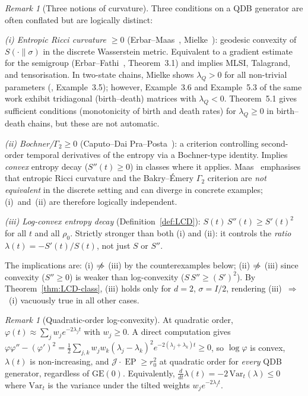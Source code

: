 \documentclass[11pt,a4paper]{article}
\theoremstyle{definition}
\theoremstyle{remark}
\newtheorem{remark}[theorem]{Remark}
\DeclareMathOperator{\EP}{EP}
\newcommand{\GE}{\mathrm{GE}}
\begin{document}
\begin{remark}[Three notions of curvature]\label{rem:GE-vs-LCD}
Three conditions on a QDB generator are often conflated but are
logically distinct:

\emph{(i) Entropic Ricci curvature $\ge 0$}
(Erbar--Maas~\cite{ErbarMaas2012}, Mielke~\cite{Mielke2013}):
geodesic convexity of $S(\cdot\|\sigma)$ in the discrete
Wasserstein metric.  Equivalent to a gradient estimate for the
semigroup (Erbar--Fathi~\cite{ErbarFathi2018},
Theorem~3.1) and implies MLSI,
Talagrand, and tensorisation.
In two-state chains, Mielke shows $\lambda_Q > 0$ for all
non-trivial parameters (\cite{Mielke2013}, Example~3.5);
however, Example~3.6 and Example~5.3 of the same work exhibit
tridiagonal (birth--death) matrices with $\lambda_Q < 0$.
Theorem~5.1 gives sufficient conditions (monotonicity of birth
and death rates) for $\lambda_Q \ge 0$ in birth--death chains,
but these are not automatic.

\emph{(ii) Bochner/$\Gamma_2 \ge 0$}
(Caputo--Dai Pra--Posta~\cite{CaputoDaiPraPosta2009}): a criterion
controlling second-order temporal derivatives of the entropy via a
Bochner-type identity.  Implies \emph{convex} entropy decay
($S''(t) \ge 0$) in classes where it applies.
Maas~\cite{Maas2017} emphasises that entropic Ricci curvature
and the Bakry--\'Emery $\Gamma_2$ criterion are \emph{not
equivalent} in the discrete setting and can diverge in concrete
examples; (i)~and~(ii) are therefore logically independent.

\emph{(iii) Log-convex entropy decay} (Definition~\ref{def:LCD}):
$S(t)\,S''(t) \ge S'(t)^2$ for all $t$ and all $\rho_0$.
Strictly stronger than both (i) and (ii): it controls the
\emph{ratio} $\lambda(t) = -S'(t)/S(t)$, not just $S$ or $S''$.

The implications are:
(i) $\centernot\Rightarrow$ (iii) by the counterexamples below;
(ii) $\centernot\Rightarrow$ (iii) since convexity
($S'' \ge 0$) is weaker than log-convexity
($S\,S'' \ge (S')^2$).
By Theorem~\ref{thm:LCD-class}, (iii) holds only for
$d = 2$, $\sigma = I/2$, rendering (iii)~$\Rightarrow$~(i)
vacuously true in all other cases.
\end{remark}

\begin{remark}[Quadratic-order log-convexity]\label{rem:logconvex}
At quadratic order, $\varphi(t) \approx \sum_j w_j e^{-2\lambda_j t}$
with $w_j \ge 0$.  A direct computation gives
$\varphi\varphi'' - (\varphi')^2 = \tfrac{1}{2}\sum_{j,k}w_jw_k
(\lambda_j-\lambda_k)^2e^{-2(\lambda_j+\lambda_k)t} \ge 0$,
so $\log\varphi$ is convex, $\lambda(t)$ is non-increasing, and
$\mathcal{J}\cdot\EP \ge r_0^2$ at quadratic order for
\emph{every} QDB generator, regardless of $\GE(0)$.
Equivalently, $\frac{d}{dt}\lambda(t) = -2\,\mathrm{Var}_t(\lambda)
\le 0$ where $\mathrm{Var}_t$ is the variance under the tilted
weights $w_j e^{-2\lambda_j t}$.
\end{remark}
\end{document}
